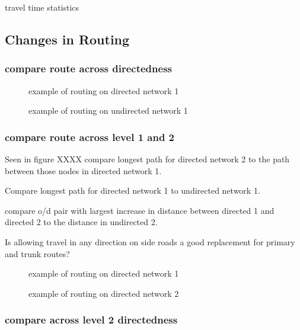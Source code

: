 \begin{table}
\centering
\caption{travel time statistics}
\label{table:travel_time_stats}
\end{table}

\subsection{Changes in Routing}


\subsubsection{compare route across directedness}
\begin{figure}
\centering
\caption{example of routing on directed network 1}
\label{fig:routing_1}
\end{figure}

\begin{figure}
\centering
\caption{example of routing on undirected network 1}
\label{fig:routing_1}
\end{figure}

\subsubsection{compare route across level 1 and 2}

Seen in figure XXXX  compare longest path for directed network 2 to the path between those nodes in directed network 1. 

Compare longest path for directed network 1 to undirected network 1. 

compare o/d pair with largest increase in distance between directed 1 and directed 2 to the distance in undirected 2. 

Is allowing travel in any direction on side roads a good replacement for primary and trunk routes?


\begin{figure}
\centering
\caption{example of routing on directed network 1}
\label{fig:routing_1}
\end{figure}

\begin{figure}
\centering
\caption{example of routing on directed network 2}
\label{fig:routing_1}
\end{figure}

\subsubsection{compare across level 2 directedness}

